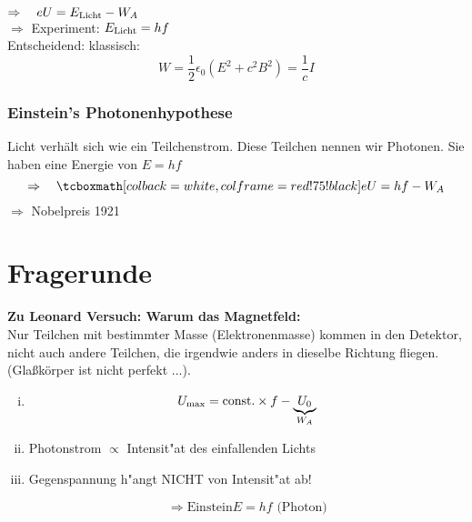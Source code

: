 \\
$ \Rightarrow \quad e U = E_{\textrm{Licht}} - W_A $\\[5pt]
$ \Rightarrow $ Experiment: $ E_{\textrm{Licht}} = h f $\\[5pt]
Entscheidend: klassisch:
\begin{equation*}
W = \frac{1}{2} \epsilon_0 (E^2 + c^2 B^2) = \frac{1}{c} I
\end{equation*}

\subsubsection{Einstein's Photonenhypothese}

Licht verhält sich wie ein Teilchenstrom. Diese Teilchen nennen wir Photonen. Sie haben eine Energie von $ E = h f $
\begin{equation*}
\Rightarrow \quad \rmbox{e U = h f - W_A}
\end{equation*}
$ \Rightarrow $ Nobelpreis 1921

\section*{Fragerunde}


\textbf{Zu Leonard Versuch: Warum das Magnetfeld:}\\
Nur Teilchen mit bestimmter Masse (Elektronenmasse) kommen in den Detektor, nicht auch andere Teilchen, die irgendwie anders in dieselbe Richtung fliegen. (Glaßkörper ist nicht perfekt ...).\\[5pt]



\begin{enumerate}[(i)]
\item 
\begin{center}
\end{center}

\[U_\mathrm{max}=\textrm{const.}\times f-\underbrace{U_0}_{W_A}\]

\item Photonstrom $\propto$ Intensit"at des einfallenden Lichts

\item Gegenspannung h"angt NICHT von Intensit"at ab!

\[\Rightarrow \textrm{Einstein} E=hf\textrm{ (Photon)}\]

\end{enumerate}

